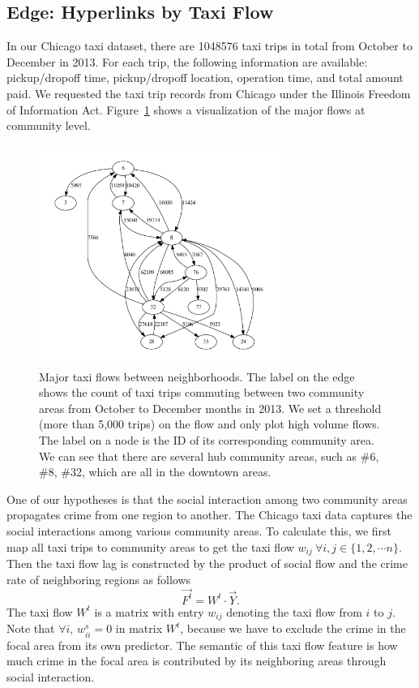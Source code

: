 \subsection{Edge: Hyperlinks by Taxi Flow}

In our Chicago taxi dataset, there are \num{1048576} taxi trips in total from October to December in 2013. For each trip, the following information are available: pickup/dropoff time, pickup/dropoff location, operation time, and total amount paid. We requested the taxi trip records from Chicago under the Illinois Freedom of Information Act.  Figure~\ref{fig:taxi-flow} shows a visualization of the major flows at community level.

\begin{figure}[htb]
\centering
\includegraphics[width=0.7\textwidth]{fig/taxiflow.pdf}
\caption{Major taxi flows between neighborhoods. The label on the edge shows the count of taxi trips  commuting between two community areas from October to December months in 2013. We set a threshold (more than 5,000 trips) on the flow and only plot high volume flows. The label on a node is the ID of its corresponding community area. We can see that there are several hub community areas, such as \#6, \#8, \#32, which are all in the downtown areas. }
\label{fig:taxi-flow}
\end{figure}


One of our hypotheses is that the social interaction among two community areas propagates crime from one region to another.
The Chicago taxi data captures the social interactions among various community areas. To calculate this, we first map all taxi trips to community areas to get the taxi flow $w_{ij}\ \forall i,j \in \{1, 2, \cdots n\}$. Then the taxi flow lag is constructed by the product of social flow and the crime rate of neighboring regions as follows
\begin{equation}
\vec{F^t} = W^t \cdot \vec{Y}.
\label{eq:taxi}
\end{equation}
The taxi flow $W^t$ is a matrix with entry $w_{ij}$ denoting the taxi flow from $i$ to $j$. Note that $\forall i$, $w^s_{ii} = 0$ in matrix $W^t$, because we have to exclude the crime in the focal area from its own predictor. The semantic of this taxi flow feature is how much crime in the focal area is contributed by its neighboring areas through social interaction.

